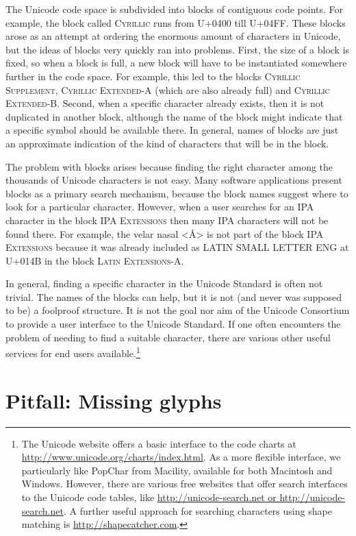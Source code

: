 The Unicode code space is subdivided into blocks of contiguous code points. For
example, the block called \textsc{Cyrillic} runs from U+0400 till U+04FF. These
blocks arose as an attempt at ordering the enormous amount of characters in
Unicode, but the ideas of blocks very quickly ran into problems. First, the size
of a block is fixed, so when a block is full, a new block will have to be
instantiated somewhere further in the code space. For example, this led to the
blocks \textsc{Cyrillic Supplement}, \textsc{Cyrillic Extended-A} (which are
also already full) and \textsc{Cyrillic Extended-B}. Second, when a specific
character already exists, then it is not duplicated in another block, although
the name of the block might indicate that a specific symbol should be available
there. In general, names of blocks are just an approximate indication of the
kind of characters that will be in the block.

The problem with blocks arises because finding the right character among the
thousands of Unicode characters is not easy. Many software applications present
blocks as a primary search mechanism, because the block names suggest where to
look for a particular character. However, when a user searches for an IPA
character in the block \textsc{IPA Extensions} then many IPA characters will not
be found there. For example, the velar nasal <Å> is not part of the block
\textsc{IPA Extensions} because it was already included as LATIN SMALL LETTER
ENG at U+014B in the block \textsc{Latin Extensions-A}.

In general, finding a specific character in the Unicode Standard is often not
trivial. The names of the blocks can help, but it is not (and never was supposed
to be) a foolproof structure. It is not the goal nor aim of the Unicode
Consortium to provide a user interface to the Unicode Standard. If one often
encounters the problem of needing to find a suitable character, there are
various other useful services for end users available.\footnote{The Unicode
website offers a basic interface to the code charts at
\url{http://www.unicode.org/charts/index.html}. As a more flexible interface, we
particularly like PopChar from Macility, available for both Macintosh and
Windows. However, there are various free websites that offer search interfaces
to the Unicode code tables, like \url{http://unicode-search.net or
http://unicode-search.net}. A further useful approach for searching characters
using shape matching is \url{http://shapecatcher.com}.}

\section{Pitfall: Missing glyphs} \label{pitfall-missing-glyphs}

